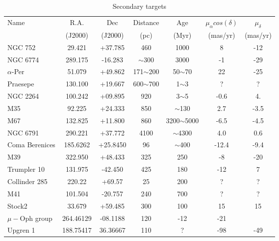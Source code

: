 \begin{table*}
\caption{Secondary targets}      
\label{tab:secondarytargets}    
\centering                     
\begin{tabular}{l c c c c c c}  
\hline
\hline
Name & R.A.  & Dec  & Distance & Age & $\mu_{\alpha} cos(\delta)$ & $\mu_{\delta}$ \\
  & (J2000) & (J2000) & (pc) & (Myr) & (mas/yr) & (mas/yr) \\
\hline
NGC 752            &  29.421     &  +37.785   	 &   460               &    1000          &  8                                        &  -12                          \\
 NGC 6774            &  289.175     &  -16.283   	 &   $\sim$300               &    3000          &  -1                                        &  -29                          \\
$\alpha$-Per   &  51.079     &  +49.862  	 &   171$\sim$200    &  50$\sim$70   &  22    &  -25   \\
 Praesepe   &  130.100    &  +19.667  	 &   600$\sim$700    &  1$\sim$3   &  ?    &  ?   \\
 NGC 2264   &  100.242   &  +09.895  	 &   920    &  3$\sim$5   &  -0.6    &  4.   \\
M35   &  92.225     &  +24.333   	 &   850    &  $\sim$130   &  2.7    &  -3.5   \\
 M67   &  132.825      &  +11.800   	 &   860    &  3200$\sim$5000   &  -6.5    &  -4.5   \\
 NGC 6791   &   290.221    &  +37.772   	 &   4100    &  $\sim$4300   &  4.0    &  0.6   \\
 Coma Berenices   & 185.6262   & +25.8450	 &   96    &  $\sim$400   &  -12.4   &  -9.4   \\
 M39   &  322.950   &  +48.433 	 &  325   &  250   &  -8   & -20      \\
 Trumpler 10   &  131.975   &  -42.450 	 &  425   &  180   &  -12   &  7   \\
 Collinder 285   &  220.22   &  +69.57 	 &  25   &  200   &  ?   &  ?   \\
 M41   &   101.504   &  -20.757 	 &  240   &  700   &  ?   &  ?   \\
 Stock2   &   33.679   &  +59.485 	 &  300   &  100   &  15   &  15    \\
 $\mu-$Oph group   &   264.46129  &  -08.1188 	 &  120   &  -12   &  -21    \\
 Upgren 1   &   188.75417  &  36.36667 	 &  110   &  ?   &  -98   &  -49    \\
 \hline
\end{tabular}
\end{table*}


 